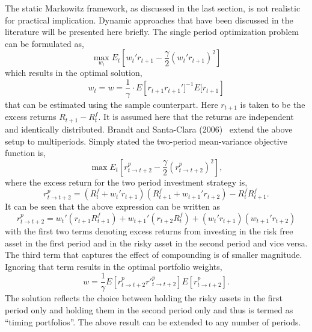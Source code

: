 The static Markowitz framework, as discussed in the last section, is not realistic for practical implication. Dynamic approaches that have been discussed in the literature will be presented here briefly. The single period optimization problem can be formulated as,
	\begin{equation} \label{eqn:periodopt}
	\max_{w_t} E_t \left[ w_t' r_{t+1} - \frac{\gamma}{2}(w_t' r_{t+1})^2 \right]
	\end{equation} 
which results in the optimal solution,
	\begin{equation} \label{eqn:periodoptimal}
	w_t= w= \frac{1}{\gamma} \cdot E \left[r_{t+1} r_{t+1}']^{-1} E[r_{t+1} \right]
	\end{equation}	
that can be estimated using the sample counterpart. Here $r_{t+1}$ is taken to be the excess returns $R_{t+1} - R_t^f$. It is assumed here that the returns are independent and identically distributed. Brandt and Santa-Clara (2006)~\cite{bransc} extend the above setup to multiperiods. Simply stated the two-period mean-variance objective function is,
	\begin{equation} \label{eqn:twoperiodmv}
	\max E_t \left[ r^p_{t \to t+2} - \frac{\gamma}{2} ( r^p_{t \to t+2})^2 \right],
	\end{equation}
where the excess return for the two period investment strategy is,
	\begin{equation} \label{eqn:twoperexcess}
	r^p_{t \to t+2} = (R_t^f + w_t' r_{t+1}) ( R^f_{t+1} + w_{t+1}' r_{t+2}) - R_t^f R_{t+1}^f.
	\end{equation}	
It can be seen that the above expression can be written as 
	\begin{equation} \label{eqn:rewritten}
	r^p_{t \to t+2} = w_t' (r_{t+1} R_{t+1}^f) + w_{t+1}' (r_{t+2}R_t^f) + (w_t' r_{t+1})(w_{t+1}' r_{t+2})
	\end{equation}
with the first two terms denoting excess returns from investing in the risk free asset in the first period and in the risky asset in the second period and vice versa. The third term that captures the effect of compounding is of smaller magnitude. Ignoring that term results in the optimal portfolio weights,
	\begin{equation}\label{eqn:optimalweights}
	w= \frac{1}{\gamma} E\left[ r^{p}_{t \to t+2} {r'}^p_{t\to t+2} \right] E[r^{p}_{t \to t+2}].
	\end{equation}
The solution reflects the choice between holding the risky assets in the first period only and holding them in the second period only and thus is termed as ``timing portfolios''. The above result can be extended to any number of periods. \twomedskip


